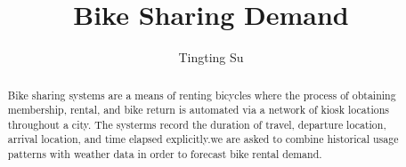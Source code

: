 \documentclass{amsart}
\begin{document}
%
%
\title[A Short Running Title]{Bike Sharing Demand}%

\author{Tingting Su}
\address[A.~1]{School of Business,\\ 
Beijing Technology and Business University, Beijing, China}%


%
%
\date{\gitAuthorDate}%

\begin{abstract}
    Bike sharing systems are a means of renting bicycles where 
    the process of obtaining membership, rental, and bike return is automated 
    via a network of kiosk locations throughout a city. The systerms record
    the duration of travel, departure location, arrival location, 
    and time elapsed explicitly.we are asked to combine historical 
    usage patterns with weather data in order to forecast bike rental demand. 
\end{abstract}

\maketitle
\tableofcontents

\newpage



\newpage



\listoftodos
\end{document}
